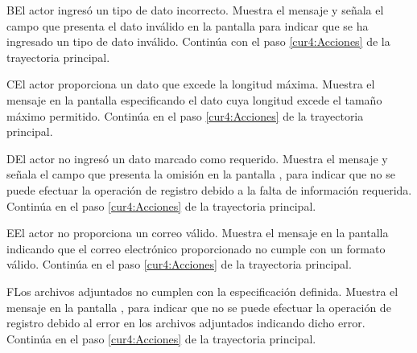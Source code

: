    \begin{UCtrayectoriaA}{B}{El actor ingresó un tipo de dato incorrecto.}
    \UCpaso[\UCsist] Muestra el mensaje  y señala el campo que presenta el dato inválido en la 
    pantalla  para indicar que se ha ingresado un tipo de dato inválido.
    \UCpaso[] Continúa con el paso \ref{cur4:Acciones} de la trayectoria principal.
 \end{UCtrayectoriaA}

 \begin{UCtrayectoriaA}{C}{El actor proporciona un dato que excede la longitud máxima.}
    \UCpaso[\UCsist] Muestra el mensaje  en la pantalla  especificando el dato cuya longitud excede el tamaño máximo permitido.
   \UCpaso[] Continúa en el paso \ref{cur4:Acciones} de la trayectoria principal.
 \end{UCtrayectoriaA}

 \begin{UCtrayectoriaA}{D}{El actor no ingresó un dato marcado como requerido.}
    \UCpaso[\UCsist] Muestra el mensaje  y
    señala el campo que presenta la omisión en la pantalla , para indicar que
    no se puede efectuar la operación de registro debido a la falta de información requerida.
   \UCpaso[] Continúa en el paso \ref{cur4:Acciones} de la trayectoria principal.
 \end{UCtrayectoriaA}
 
 \begin{UCtrayectoriaA}{E}{El actor no proporciona un correo válido.}
    \UCpaso[\UCsist] Muestra el mensaje  en la pantalla  indicando que el correo electrónico proporcionado no cumple con un formato válido.
    \UCpaso Continúa en el paso \ref{cur4:Acciones} de la trayectoria principal.
 \end{UCtrayectoriaA}

 \begin{UCtrayectoriaA}{F}{Los archivos adjuntados no cumplen con la especificación definida.}
    \UCpaso[\UCsist] Muestra el mensaje  en la pantalla , para indicar que
    no se puede efectuar la operación de registro debido al error en los archivos adjuntados indicando dicho error.
   \UCpaso[] Continúa en el paso \ref{cur4:Acciones} de la trayectoria principal.
 \end{UCtrayectoriaA}


